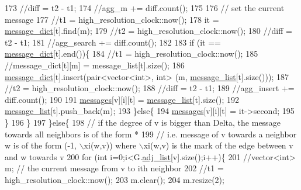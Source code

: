 \begin{DoxyCode}
173           \textcolor{comment}{//diff = t2 - t1;}
174           \textcolor{comment}{//agg\_m += diff.count();}
175 
176           \textcolor{comment}{// set the current message}
177           \textcolor{comment}{//t1 = high\_resolution\_clock::now();}
178           it = \hyperlink{classgraph__message_ab54d89b122c2b1322da0d5db2043fb84}{message\_dict}[t].find(m);
179           \textcolor{comment}{//t2 = high\_resolution\_clock::now();}
180           \textcolor{comment}{//diff = t2 - t1;}
181           \textcolor{comment}{//agg\_search += diff.count();}
182 
183           \textcolor{keywordflow}{if} (it == \hyperlink{classgraph__message_ab54d89b122c2b1322da0d5db2043fb84}{message\_dict}[t].end())\{
184             \textcolor{comment}{//t1 = high\_resolution\_clock::now();}
185             \textcolor{comment}{//message\_dict[t][m] = message\_list[t].size();}
186             \hyperlink{classgraph__message_ab54d89b122c2b1322da0d5db2043fb84}{message\_dict}[t].insert(pair<vector<int>, \textcolor{keywordtype}{int}> (m, 
      \hyperlink{classgraph__message_aa17fdb629b423343edfafa97252763ef}{message\_list}[t].size()));
187             \textcolor{comment}{//t2 = high\_resolution\_clock::now();}
188             \textcolor{comment}{//diff = t2 - t1;}
189             \textcolor{comment}{//agg\_insert += diff.count();}
190 
191             \hyperlink{classgraph__message_aac77e098f0acf9650116a8e51fe3b4b7}{messages}[v][i][t] = \hyperlink{classgraph__message_aa17fdb629b423343edfafa97252763ef}{message\_list}[t].size();
192             \hyperlink{classgraph__message_aa17fdb629b423343edfafa97252763ef}{message\_list}[t].push\_back(m);
193           \}\textcolor{keywordflow}{else}\{
194             \hyperlink{classgraph__message_aac77e098f0acf9650116a8e51fe3b4b7}{messages}[v][i][t] = it->second;
195           \}
196         \}
197       \}\textcolor{keywordflow}{else}\{
198         \textcolor{comment}{// if the degree of v is bigger than Delta, the message towards all neighbors is of the form *}
199         \textcolor{comment}{// i.e. message of v towards a neighbor w is of the form (-1, \(\backslash\)xi(w,v)) where \(\backslash\)xi(w,v) is the mark
       of the edge between v and w towards v}
200         \textcolor{keywordflow}{for} (\textcolor{keywordtype}{int} i=0;i<G.\hyperlink{classmarked__graph_a1a0bf7ca413a278763f7c878b3b6fd6f}{adj\_list}[v].size();i++)\{
201           \textcolor{comment}{//vector<int> m; // the current message from v to ith neighbor}
202           \textcolor{comment}{//t1 = high\_resolution\_clock::now();}
203           m.clear();
204           m.resize(2);

\end{DoxyCode}
